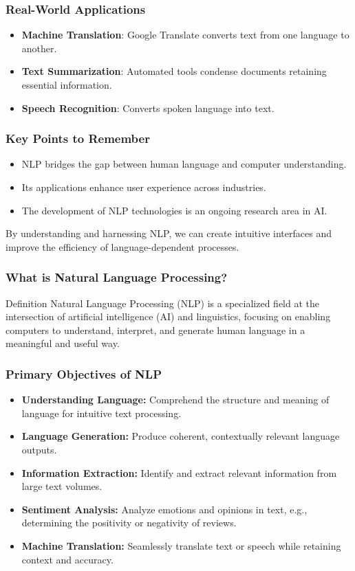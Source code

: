 \documentclass[aspectratio=169]{beamer}
\begin{document}
\begin{frame}[fragile]
    \frametitle{Real-World Applications}
    \begin{itemize}
        \item \textbf{Machine Translation}: Google Translate converts text from one language to another.
        \item \textbf{Text Summarization}: Automated tools condense documents retaining essential information.
        \item \textbf{Speech Recognition}: Converts spoken language into text.
    \end{itemize}
\end{frame}

\begin{frame}[fragile]
    \frametitle{Key Points to Remember}
    \begin{itemize}
        \item NLP bridges the gap between human language and computer understanding.
        \item Its applications enhance user experience across industries.
        \item The development of NLP technologies is an ongoing research area in AI.
    \end{itemize}
    By understanding and harnessing NLP, we can create intuitive interfaces and improve the efficiency of language-dependent processes.
\end{frame}

\begin{frame}[fragile]
    \frametitle{What is Natural Language Processing?}
    \begin{block}{Definition}
        Natural Language Processing (NLP) is a specialized field at the intersection of artificial intelligence (AI) and linguistics, focusing on enabling computers to understand, interpret, and generate human language in a meaningful and useful way.
    \end{block}
\end{frame}

\begin{frame}[fragile]
    \frametitle{Primary Objectives of NLP}
    \begin{itemize}
        \item \textbf{Understanding Language:} Comprehend the structure and meaning of language for intuitive text processing.
        \item \textbf{Language Generation:} Produce coherent, contextually relevant language outputs.
        \item \textbf{Information Extraction:} Identify and extract relevant information from large text volumes.
        \item \textbf{Sentiment Analysis:} Analyze emotions and opinions in text, e.g., determining the positivity or negativity of reviews.
        \item \textbf{Machine Translation:} Seamlessly translate text or speech while retaining context and accuracy.
    \end{itemize}
\end{frame}
\end{document}
